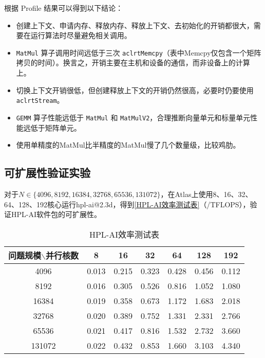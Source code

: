 根据 Profile 结果可以得到以下结论：

\begin{itemize}
    \item 创建上下文、申请内存、释放内存、释放上下文、去初始化的开销都很大，需要在运行算法时尽量避免相关调用。
    \item \lstinline{MatMul} 算子调用时间远低于三次 \lstinline{aclrtMemcpy}（表中Memcpy仅包含一个矩阵拷贝的时间）。换言之，开销主要在主机和设备的通信，而非设备上的计算上。
    \item 切换上下文开销很低，但创建释放上下文的开销仍然很高，必要时仍要使用 \lstinline{aclrtStream}。
    \item \lstinline{GEMM} 算子性能远低于 \lstinline{MatMul} 和 \lstinline{MatMulV2}，合理推断向量单元和标量单元性能远低于矩阵单元。
    \item 使用单精度的MatMul比半精度的MatMul慢了几个数量级，比较鸡肋。
\end{itemize}

\subsection{可扩展性验证实验}

对于$N\in\lbrace 4096,8192,16384,32768,65536,131072\rbrace$，在Atlas上使用8、16、32、64、128、192核心运行hpl-ai@2.3d，得到\autoref{HPL-AI效率测试表}（/TFLOPS），验证HPL-AI软件包的可扩展性。

\begin{table}[h] %
    \centering
    \caption{HPL-AI效率测试表}
    \label{HPL-AI效率测试表}
    \begin{tabular}{c|cccccc}
        \toprule
        问题规模$\backslash$并行核数 & 8     & 16    & 32    & 64    & 128   & 192   \\
        \midrule
        4096                         & 0.013 & 0.215 & 0.323 & 0.428 & 0.456 & 0.112 \\
        \hline
        8192                         & 0.016 & 0.305 & 0.526 & 0.816 & 1.052 & 1.080 \\
        \hline
        16384                        & 0.019 & 0.358 & 0.673 & 1.172 & 1.683 & 2.018 \\
        \hline
        32768                        & 0.020 & 0.389 & 0.752 & 1.331 & 2.331 & 2.766 \\
        \hline
        65536                        & 0.021 & 0.417 & 0.816 & 1.532 & 2.732 & 3.660 \\
        \hline
        131072                       & 0.022 & 0.432 & 0.853 & 1.660 & 3.103 & 4.340 \\
        \bottomrule
    \end{tabular}
\end{table}

